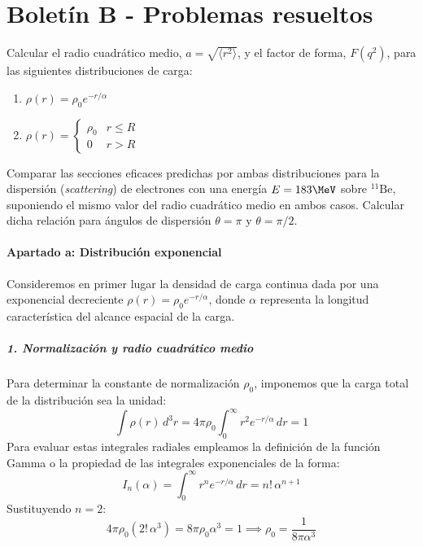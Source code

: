 \chapter{Boletín B - Problemas resueltos}
\begin{problema}
Calcular el radio cuadrático medio, $a = \sqrt{\langle r^2 \rangle}$, y el factor de forma, $F(q^2)$, para las siguientes distribuciones de carga:
\begin{enumerate}[label=\alph*.-]
    \item $\rho(r) = \rho_0 e^{-r/\alpha}$
    \item $\rho(r) = \begin{cases} \rho_0 & r \le R \\ 0 & r > R \end{cases}$
\end{enumerate}
Comparar las secciones eficaces predichas por ambas distribuciones para la dispersión (\textit{scattering}) de electrones con una energía $E = 183 \MeV$ sobre $^{11}\text{Be}$, suponiendo el mismo valor del radio cuadrático medio en ambos casos. Calcular dicha relación para ángulos de dispersión $\theta = \pi$ y $\theta = \pi/2$.

\tcblower

\subsubsection*{Apartado a: Distribución exponencial}

Consideremos en primer lugar la densidad de carga continua dada por una exponencial decreciente $\rho(r) = \rho_0 e^{-r/\alpha}$, donde $\alpha$ representa la longitud característica del alcance espacial de la carga.

\paragraph{1. Normalización y radio cuadrático medio}
Para determinar la constante de normalización $\rho_0$, imponemos que la carga total de la distribución sea la unidad:
\begin{equation}
    \int \rho(r) \, d^3r = 4\pi \rho_0 \int_0^\infty r^2 e^{-r/\alpha} \, dr = 1
\end{equation}
Para evaluar estas integrales radiales empleamos la definición de la función Gamma o la propiedad de las integrales exponenciales de la forma:
\begin{equation}
    I_n(\alpha) = \int_0^\infty r^n e^{-r/\alpha} \, dr = n! \, \alpha^{n+1}
\end{equation}
Sustituyendo $n = 2$:
\begin{equation}
    4\pi \rho_0 (2! \, \alpha^3) = 8\pi \rho_0 \alpha^3 = 1 \implies \rho_0 = \frac{1}{8\pi \alpha^3}
\end{equation}


\end{problema}
